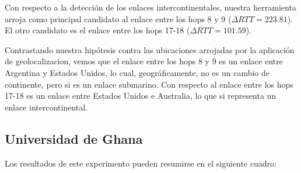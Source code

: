Con respecto a la detección de los enlaces intercontinentales, nuestra herramienta arroja como principal candidato al enlace entre los hops 8 y 9 ($\Delta RTT = 223.81$). El otro candidato es el enlace entre los hops 17-18 ($\Delta RTT = 101.59$).

Contrastando nuestra hipótesis contra las ubicaciones arrojadas por la aplicación de geolocalizacion, vemos que el enlace entre los hops 8 y 9 es un enlace entre Argentina y Estados Unidos, lo cual, geográficamente, no es un cambio de continente, pero si es un enlace submarino. Con respecto al enlace entre los hops 17-18 es un enlace entre Estados Unidos e Australia, lo que si representa un enlace intercontinental.

\subsection{Universidad de Ghana}

Los resultados de este experimento pueden resumirse en el siguiente cuadro:

